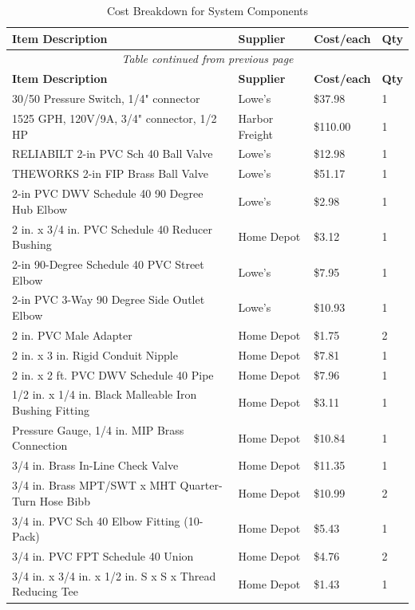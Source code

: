 \documentclass[12pt]{report}
\begin{document}
\begin{longtable}{|p{8cm}|p{2.5cm}|p{2cm}|p{1cm}|}
\caption{Cost Breakdown for System Components}\\
\hline
\textbf{Item Description} & \textbf{Supplier} & \textbf{Cost/each} & \textbf{Qty} \\ \hline
\endfirsthead
\multicolumn{4}{c}{\textit{Table continued from previous page}}\\ \hline
\textbf{Item Description} & \textbf{Supplier} & \textbf{Cost/each} & \textbf{Qty} \\ \hline
\endhead
30/50 Pressure Switch, 1/4" connector & Lowe's & \$37.98 & 1 \\ \hline
1525 GPH, 120V/9A, 3/4" connector, 1/2 HP & Harbor Freight & \$110.00 & 1 \\ \hline
RELIABILT 2-in PVC Sch 40 Ball Valve & Lowe's & \$12.98 & 1 \\ \hline
THEWORKS 2-in FIP Brass Ball Valve & Lowe's & \$51.17 & 1 \\ \hline
2-in PVC DWV Schedule 40 90 Degree Hub Elbow & Lowe's & \$2.98 & 1 \\ \hline
2 in. x 3/4 in. PVC Schedule 40 Reducer Bushing & Home Depot & \$3.12 & 1 \\ \hline
2-in 90-Degree Schedule 40 PVC Street Elbow & Lowe's & \$7.95 & 1 \\ \hline
2-in PVC 3-Way 90 Degree Side Outlet Elbow & Lowe's & \$10.93 & 1 \\ \hline
2 in. PVC Male Adapter & Home Depot & \$1.75 & 2 \\ \hline
2 in. x 3 in. Rigid Conduit Nipple & Home Depot & \$7.81 & 1 \\ \hline
2 in. x 2 ft. PVC DWV Schedule 40 Pipe & Home Depot & \$7.96 & 1 \\ \hline
1/2 in. x 1/4 in. Black Malleable Iron Bushing Fitting & Home Depot & \$3.11 & 1 \\ \hline
Pressure Gauge, 1/4 in. MIP Brass Connection & Home Depot & \$10.84 & 1 \\ \hline
3/4 in. Brass In-Line Check Valve & Home Depot & \$11.35 & 1 \\ \hline
3/4 in. Brass MPT/SWT x MHT Quarter-Turn Hose Bibb & Home Depot & \$10.99 & 2 \\ \hline
3/4 in. PVC Sch 40 Elbow Fitting (10-Pack) & Home Depot & \$5.43 & 1 \\ \hline
3/4 in. PVC FPT Schedule 40 Union & Home Depot & \$4.76 & 2 \\ \hline
3/4 in. x 3/4 in. x 1/2 in. S x S x Thread Reducing Tee & Home Depot & \$1.43 & 1 \\ \hline

\end{longtable}
\end{document}

